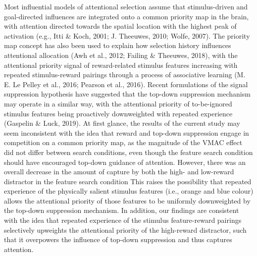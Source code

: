 \documentclass[jou, a4paper, noextraspace,floatsintext]{apa6}
\theoremstyle{definition}
\theoremstyle{definition}
\theoremstyle{definition}
\theoremstyle{remark}
\begin{document}
Most influential models of attentional selection assume that
stimulus-driven and goal-directed influences are integrated onto a
common priority map in the brain, with attention directed towards the
spatial location with the highest peak of activation (e.g., Itti \&
Koch, 2001; J. Theeuwes, 2010; Wolfe, 2007). The priority map concept
has also been used to explain how selection history influences
attentional allocation (Awh et al., 2012; Failing \& Theeuwes, 2018),
with the attentional priority signal of reward-related stimulus features
increasing with repeated stimulus-reward pairings through a process of
associative learning (M. E. Le Pelley et al., 2016; Pearson et al.,
2016). Recent formulations of the signal suppression hypothesis have
suggested that the top-down suppression mechanism may operate in a
similar way, with the attentional priority of to-be-ignored stimulus
features being proactively downweighted with repeated experience
(Gaspelin \& Luck, 2019). At first glance, the results of the current
study may seem inconsistent with the idea that reward and top-down
suppression engage in competition on a common priority map, as the
magnitude of the VMAC effect did not differ between search conditions,
even though the feature search condition should have encouraged top-down
guidance of attention. However, there was an overall decrease in the
amount of capture by both the high- and low-reward distractor in the
feature search condition This raises the possibility that repeated
experience of the physically salient stimulus features (i.e., orange and
blue colour) allows the attentional priority of those features to be
uniformly downweighted by the top-down suppression mechanism. In
addition, our findings are consistent with the idea that repeated
experience of the stimulus feature-reward pairings selectively upweights
the attentional priority of the high-reward distractor, such that it
overpowers the influence of top-down suppression and thus captures
attention.
\end{document}
